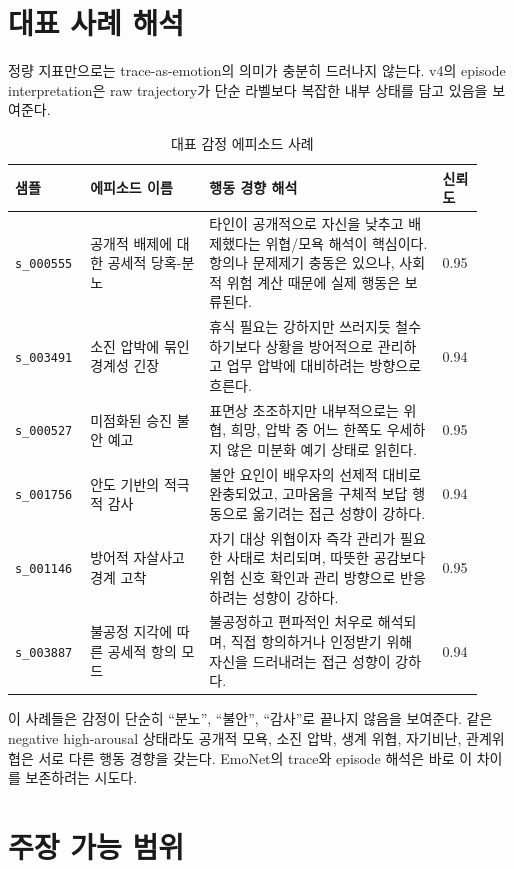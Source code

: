 \documentclass[11pt,a4paper]{article}
\newcommand{\eng}[1]{\texttt{#1}}
\begin{document}
\section{대표 사례 해석}

정량 지표만으로는 trace-as-emotion의 의미가 충분히 드러나지 않는다. v4의 episode interpretation은 raw trajectory가 단순 라벨보다 복잡한 내부 상태를 담고 있음을 보여준다.

\begin{longtable}{p{0.14\linewidth}p{0.24\linewidth}p{0.47\linewidth}p{0.08\linewidth}}
\caption{대표 감정 에피소드 사례}\\
\toprule
샘플 & 에피소드 이름 & 행동 경향 해석 & 신뢰도 \\
\midrule
\eng{s\_000555} & 공개적 배제에 대한 공세적 당혹-분노 & 타인이 공개적으로 자신을 낮추고 배제했다는 위협/모욕 해석이 핵심이다. 항의나 문제제기 충동은 있으나, 사회적 위험 계산 때문에 실제 행동은 보류된다. & 0.95 \\
\eng{s\_003491} & 소진 압박에 묶인 경계성 긴장 & 휴식 필요는 강하지만 쓰러지듯 철수하기보다 상황을 방어적으로 관리하고 업무 압박에 대비하려는 방향으로 흐른다. & 0.94 \\
\eng{s\_000527} & 미점화된 승진 불안 예고 & 표면상 초조하지만 내부적으로는 위협, 희망, 압박 중 어느 한쪽도 우세하지 않은 미분화 예기 상태로 읽힌다. & 0.95 \\
\eng{s\_001756} & 안도 기반의 적극적 감사 & 불안 요인이 배우자의 선제적 대비로 완충되었고, 고마움을 구체적 보답 행동으로 옮기려는 접근 성향이 강하다. & 0.94 \\
\eng{s\_001146} & 방어적 자살사고 경계 고착 & 자기 대상 위협이자 즉각 관리가 필요한 사태로 처리되며, 따뜻한 공감보다 위험 신호 확인과 관리 방향으로 반응하려는 성향이 강하다. & 0.95 \\
\eng{s\_003887} & 불공정 지각에 따른 공세적 항의 모드 & 불공정하고 편파적인 처우로 해석되며, 직접 항의하거나 인정받기 위해 자신을 드러내려는 접근 성향이 강하다. & 0.94 \\
\bottomrule
\end{longtable}

이 사례들은 감정이 단순히 ``분노'', ``불안'', ``감사''로 끝나지 않음을 보여준다. 같은 negative high-arousal 상태라도 공개적 모욕, 소진 압박, 생계 위협, 자기비난, 관계위협은 서로 다른 행동 경향을 갖는다. EmoNet의 trace와 episode 해석은 바로 이 차이를 보존하려는 시도다.

\section{주장 가능 범위}
\end{document}
